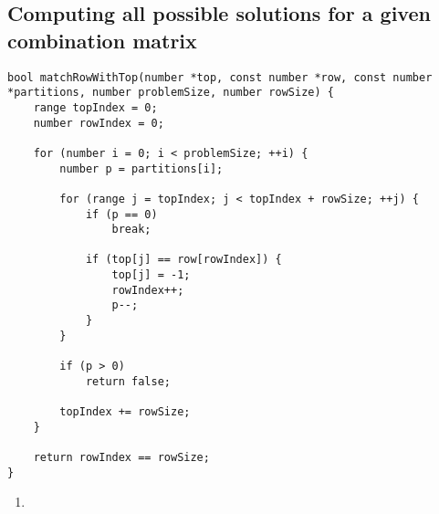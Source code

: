 \subsection{Computing all possible solutions for a given combination matrix}

\begin{lstlisting}[caption={},label={matchRowWithTop}]
bool matchRowWithTop(number *top, const number *row, const number *partitions, number problemSize, number rowSize) {
    range topIndex = 0;
    number rowIndex = 0;

    for (number i = 0; i < problemSize; ++i) {
        number p = partitions[i];

        for (range j = topIndex; j < topIndex + rowSize; ++j) {
            if (p == 0)
                break;

            if (top[j] == row[rowIndex]) {
                top[j] = -1;
                rowIndex++;
                p--;
            }
        }

        if (p > 0)
            return false;

        topIndex += rowSize;
    }

    return rowIndex == rowSize;
}
\end{lstlisting}

\begin{enumerate}
\addtocounter{enumi}{1}
\item 
\end{enumerate}

